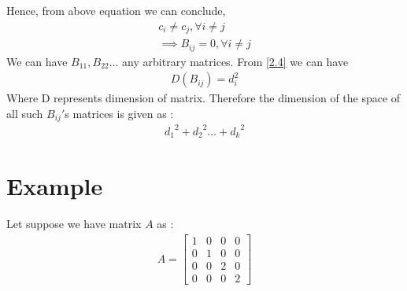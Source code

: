\documentclass[journal,12pt,twocolumn]{IEEEtran}
\begin{document}
 Hence, from above  equation  we can conclude,
 \begin{align}
 c_i \neq c_j, \forall i \neq j\\
 \implies B_{ij} = 0, \forall i \neq j
 \end{align}
We can have $B_{11}, B_{22} \dots$ any arbitrary matrices. From \eqref{2.4} we can have  
\begin{align}
 D(B_{ij}) = d_i^{2} 
 \end{align}
Where D  represents dimension of matrix. Therefore the dimension of the space of all such $B_{ij}{'}$s matrices is given as :
\begin{align}
{d_1}^2 + {d_2}^2 \dots + {d_k}^2
\end{align}


\section{Example}

Let suppose we have matrix $A$ as :
\begin{align}  
A =  \begin{bmatrix}
1 & 0  & 0 & 0 \\ 
0 & 1  & 0 & 0  \\
0 & 0  & 2 & 0  \\
0 & 0  & 0 & 2    
\end{bmatrix}
\end{align}
\end{document}

